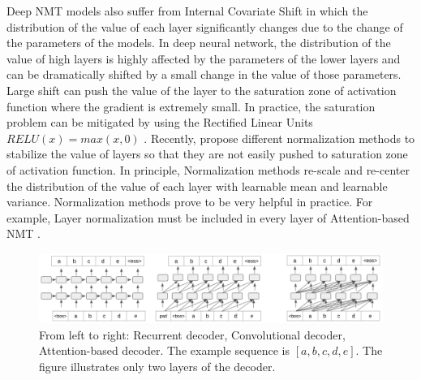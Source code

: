 Deep NMT models also suffer from Internal Covariate Shift in which the distribution of the value of each layer significantly changes due to the change of the parameters of the models. In deep neural network, the distribution of the value of high layers is highly affected by the parameters of the lower layers and can be dramatically shifted by a small change in the value of those parameters. Large shift can push the value of the layer to the saturation zone of activation function where the gradient is extremely small. In practice, the saturation problem can be mitigated by using the Rectified Linear Units $RELU(x) = max(x,0)$ \citep{Nair10rectified}. Recently, \citep{Ioffe15batch,Jimmy16layer} propose different normalization methods to stabilize the value of layers so that they are not easily pushed to saturation zone of activation function. In principle, Normalization methods re-scale and re-center the distribution of the value of each layer with learnable mean and learnable variance. Normalization methods prove to be very helpful in practice. For example, Layer normalization must be included in every layer of Attention-based NMT \citep{Vaswani17attention}.

\begin{figure}[htbp]
\includegraphics[width=\textwidth]{graphics/multi_layer_decoder.png}
\caption[Illustration of 3 most popular multi-layer auto-regressive decoding paradigms]{From left to right: Recurrent decoder, Convolutional decoder, Attention-based decoder. The example sequence is $[a,b,c,d,e]$. The figure illustrates only two layers of the decoder.}
\label{fig:multi-layer}
\end{figure}


